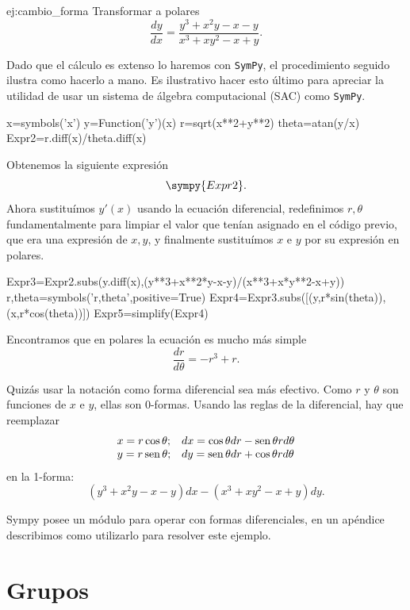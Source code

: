 \begin{ejemplo}{ej:cambio_forma} Transformar a polares
 \[
  \frac{dy}{dx}=\frac{y^3+x^2y-x-y}{x^3+xy^2-x+y}.
 \]
\end{ejemplo}

Dado que el cálculo es extenso lo haremos con \texttt{SymPy}, el procedimiento seguido ilustra como hacerlo a mano. Es ilustrativo hacer esto último para apreciar la utilidad de usar un sistema de álgebra computacional (SAC) como \texttt{SymPy}.

\begin{sympyblock}[][frame=single]
x=symbols('x')
y=Function('y')(x)
r=sqrt(x**2+y**2)
theta=atan(y/x)
Expr2=r.diff(x)/theta.diff(x)
\end{sympyblock}



Obtenemos la siguiente expresión 
\[\sympy{Expr2}.\]
Ahora sustituímos $y'(x)$ usando la ecuación diferencial, redefinimos $r,\theta$ fundamentalmente para limpiar el valor que tenían asignado en el código previo, que era una expresión de $x,y$, y finalmente sustituímos $x$ e $y$ por su expresión en polares.

\begin{sympyblock}[][frame=single]
Expr3=Expr2.subs(y.diff(x),(y**3+x**2*y-x-y)/(x**3+x*y**2-x+y))
r,theta=symbols('r,theta',positive=True)
Expr4=Expr3.subs([(y,r*sin(theta)),(x,r*cos(theta))])
Expr5=simplify(Expr4)
\end{sympyblock}


 Encontramos que en polares la ecuación es mucho más simple
\[\frac{dr}{d\theta}=-r^3+r.\]

 Quizás  usar la notación como  forma diferencial sea más efectivo. Como $r$ y $\theta$ son funciones de $x$ e $y$, ellas son 0-formas. Usando las reglas de la diferencial, hay que reemplazar
\[
\begin{array}{ll}
x=r\cos\theta; &dx=\cos\theta dr-\operatorname{sen}\theta r d\theta\\
 y= r\operatorname{sen}\theta; & dy=\operatorname{sen}\theta dr+\cos\theta r d\theta\\
\end{array}
\]
en la 1-forma:
\[(y^3+x^2y-x-y)dx-(x^3+xy^2-x+y)dy.\]

Sympy posee un módulo para operar con formas diferenciales, en un apéndice describimos como utilizarlo para resolver este ejemplo.

\section{Grupos}

